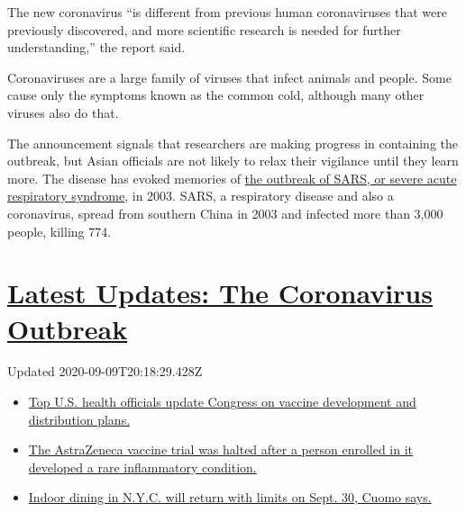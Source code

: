 The new coronavirus ``is different from previous human coronaviruses
that were previously discovered, and more scientific research is needed
for further understanding,'' the report said.

Coronaviruses are a large family of viruses that infect animals and
people. Some cause only the symptoms known as the common cold, although
many other viruses also do that.

The announcement signals that researchers are making progress in
containing the outbreak, but Asian officials are not likely to relax
their vigilance until they learn more. The disease has evoked memories
of
\href{https://www.nytimes3xbfgragh.onion/2003/04/27/world/the-sars-epidemic-the-path-from-china-s-provinces-a-crafty-germ-breaks-out.html}{the
outbreak of SARS, or severe acute respiratory syndrome}, in 2003. SARS,
a respiratory disease and also a coronavirus, spread from southern China
in 2003 and infected more than 3,000 people, killing 774.

\hypertarget{latest-updates-the-coronavirus-outbreak}{%
\section{\texorpdfstring{\href{https://www.nytimes3xbfgragh.onion/2020/09/09/world/covid-coronavirus.html?action=click\&pgtype=Article\&state=default\&region=MAIN_CONTENT_1\&context=storylines_live_updates}{Latest
Updates: The Coronavirus
Outbreak}}{Latest Updates: The Coronavirus Outbreak}}\label{latest-updates-the-coronavirus-outbreak}}

Updated 2020-09-09T20:18:29.428Z

\begin{itemize}
\tightlist
\item
  \href{https://www.nytimes3xbfgragh.onion/2020/09/09/world/covid-coronavirus.html?action=click\&pgtype=Article\&state=default\&region=MAIN_CONTENT_1\&context=storylines_live_updates\#link-279e24e2}{Top
  U.S. health officials update Congress on vaccine development and
  distribution plans.}
\item
  \href{https://www.nytimes3xbfgragh.onion/2020/09/09/world/covid-coronavirus.html?action=click\&pgtype=Article\&state=default\&region=MAIN_CONTENT_1\&context=storylines_live_updates\#link-38cb0bfc}{The
  AstraZeneca vaccine trial was halted after a person enrolled in it
  developed a rare inflammatory condition.}
\item
  \href{https://www.nytimes3xbfgragh.onion/2020/09/09/world/covid-coronavirus.html?action=click\&pgtype=Article\&state=default\&region=MAIN_CONTENT_1\&context=storylines_live_updates\#link-792ae257}{Indoor
  dining in N.Y.C. will return with limits on Sept. 30, Cuomo says.}
\end{itemize}

